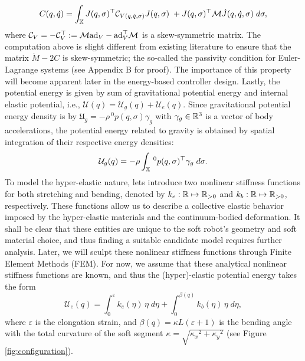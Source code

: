 {%
\begin{equation}
C(q,\dot{q}) = \int_{\mathbb{X}} J(q,\sigma)^\top \mathcal{C}_{V(q,\dot{q},\sigma)}J(q,\sigma)\; + J(q,\sigma)^\top \mathcal{M} \dot{J}(q,\dot{q},\sigma) \; d \sigma,\label{eq:coriolis}
\end{equation}
%
where $\mathcal{C}_{V} = -\mathcal{C}_{V}^\top :=  \mathcal{M} \text{ad}_{V}  - \text{ad}_{V} ^\top \mathcal{M}$ is a skew-symmetric matrix. The computation above is slight different from existing literature\cite{Boyer2021,Renda2020} to ensure that the matrix $\dot{M} - 2C$ is skew-symmetric; the so-called the passivity condition\cite{Murray1994} for Euler-Lagrange systems (see Appendix B for proof). The importance of this property will become apparent later in the energy-based controller design. Lastly, the potential energy is given by sum of gravitational potential energy and internal elastic potential, i.e., $\mathcal{U}({q}) = \mathcal{U}_g({q}) + \mathcal{U}_e({q})
$. Since gravitational potential energy density is  by $\mathfrak{U}_g = -\rho\,^0p(q,\sigma) \gamma_g$ with $\gamma_g \in \mathbb{R}^3$ is a vector of body accelerations, the potential energy related to gravity is obtained by spatial integration of their respective energy densities:
%
\begin{equation}
\mathcal{U}_g({q}) = - \rho \int_{\mathbb{X}} \,^0p(q,\sigma)^\top \gamma_g \; d \sigma.
\label{eq:potential_energy_grav}
\end{equation}
%
\noindent To model the hyper-elastic nature, lets introduce two nonlinear stiffness functions for both stretching and bending, denoted by $k_e: \mathbb{R} \mapsto \mathbb{R}_{>0}$ and $k_b: \mathbb{R} \mapsto \mathbb{R}_{>0}$, respectively. These functions allow us to describe a collective elastic behavior imposed by the hyper-elastic materials and the continuum-bodied deformation. It shall be clear that these entities are unique to the soft robot's geometry and soft material choice, and thus finding a suitable candidate model requires further analysis. Later, we will sculpt these nonlinear stiffness functions through Finite Element Methods (FEM). For now, we assume that these analytical nonlinear stiffness functions are known, and thus the (hyper)-elastic potential energy takes the form
%
\begin{equation}
\mathcal{U}_e({q}) = \int_0^{\varepsilon} k_e(\eta) \,\eta \; d \eta + \int_0^{\beta(q)} k_b(\eta)\, \eta \; d \eta,
\label{eq:potential_energy_elas}
\end{equation}
%
where $\varepsilon$ is the elongation strain, and $\beta({q}) = \kappa L (\varepsilon + 1)$ is the bending angle with the total curvature of the soft segment $\kappa = \sqrt{{\kappa_x}^2 + {\kappa_y}^2}$ (see Figure \ref{fig:configuration}).
}
